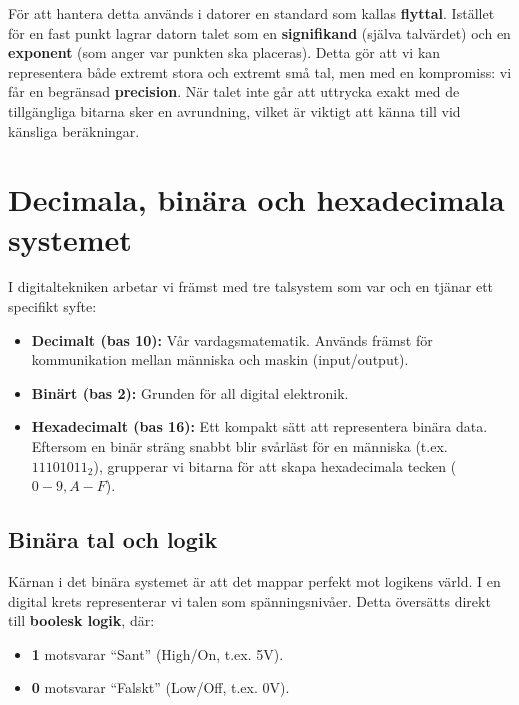 \documentclass[
  swedish,
  letterpaper,
  oneside,
  openany]{book}
\providecommand{\tightlist}{%
  \setlength{\itemsep}{0pt}\setlength{\parskip}{0pt}}
\begin{document}
För att hantera detta används i datorer en standard som kallas
\textbf{flyttal}. Istället för en fast punkt lagrar datorn talet som en
\textbf{signifikand} (själva talvärdet) och en \textbf{exponent} (som
anger var punkten ska placeras). Detta gör att vi kan representera både
extremt stora och extremt små tal, men med en kompromiss: vi får en
begränsad \textbf{precision}. När talet inte går att uttrycka exakt med
de tillgängliga bitarna sker en avrundning, vilket är viktigt att känna
till vid känsliga beräkningar.

\section{Decimala, binära och hexadecimala
systemet}\label{decimala-binuxe4ra-och-hexadecimala-systemet}

I digitaltekniken arbetar vi främst med tre talsystem som var och en
tjänar ett specifikt syfte:

\begin{itemize}
\tightlist
\item
  \textbf{Decimalt (bas 10):} Vår vardagsmatematik. Används främst för
  kommunikation mellan människa och maskin (input/output).
\item
  \textbf{Binärt (bas 2):} Grunden för all digital elektronik.
\item
  \textbf{Hexadecimalt (bas 16):} Ett kompakt sätt att representera
  binära data. Eftersom en binär sträng snabbt blir svårläst för en
  människa (t.ex. \(11101011_2\)), grupperar vi bitarna för att skapa
  hexadecimala tecken (\(0-9, A-F\)).
\end{itemize}

\subsection{Binära tal och logik}\label{binuxe4ra-tal-och-logik}

Kärnan i det binära systemet är att det mappar perfekt mot logikens
värld. I en digital krets representerar vi talen som spänningsnivåer.
Detta översätts direkt till \textbf{boolesk logik}, där:

\begin{itemize}
\tightlist
\item
  \textbf{1} motsvarar ``Sant'' (High/On, t.ex. 5V).
\item
  \textbf{0} motsvarar ``Falskt'' (Low/Off, t.ex. 0V).
\end{itemize}
\end{document}
